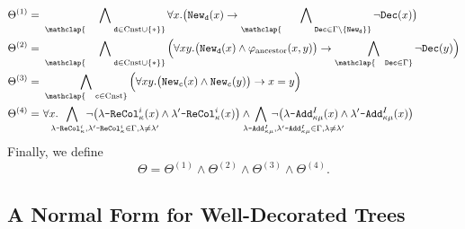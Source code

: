\documentclass[10pt,a4paper]{amsart}
\theoremstyle{definition}
\numberwithin{equation}{section}
\theoremstyle{plain}
\theoremstyle{definition}
\theoremstyle{myexample}
\theoremstyle{plain}
\theoremstyle{definition}
\newcommand{\disun}{\oplus}
\newcommand{\newconst}[1]{\pred{New}_{\const{#1}}} %
\newcommand{\cadd}[4]{#4\pred{\texttt{-}Add}^{#3}_{#1#2}} %
\newcommand{\recol}[2]{#2\pred{\texttt{-}ReCol}_{#1}}
\newcommand{\pred}[1]{\mathtt{#1}}
\newcommand{\const}[1]{\mathtt{#1}}
\begin{document}
\begin{align*}
\Theta^{\mathrm{(1)}} =\ &  \bigwedge_{\mathclap{\hspace{6ex}\const{d}\in\mathrm{Cnst}\cup\{ \ast \}}} \forall x.\big( \newconst{d}(x)\rightarrow \bigwedge_{\mathclap{\hspace{7ex}\pred{Dec}\in\Gamma{\setminus}\{ \newconst{d} \}}} \lnot\pred{Dec}(x) \big)\\
%
\Theta^{\mathrm{(2)}} =\ & \bigwedge_{\mathclap{\hspace{6ex}\const{d}\in\mathrm{Cnst}\cup\{ \ast \}}} \Big(\forall xy. \big(\newconst{d}(x) \wedge \varphi_{\mathrm{ancestor}}(x,y) \big) \rightarrow \bigwedge_{\mathclap{\hspace{2ex}\pred{Dec}\in\Gamma}}\lnot\pred{Dec}(y)\Big)\\
%
\Theta^{\mathrm{(3)}} =\ & \bigwedge_{\mathclap{\hspace{2ex}\const{c}\in\mathrm{Cnst}}} \Big( \forall xy. \big(\newconst{c}(x) \land \newconst{c}(y)\big) \rightarrow x = y \Big)\\
%
\Theta^{\mathrm{(4)}} =\ & \forall x. \hspace{-16ex}\bigwedge_{\hspace{14ex}{\recol{\kappa}{\lambda}^{i},\recol{\kappa}{\lambda'}^{i}\in\Gamma, \lambda\neq\lambda'}}\hspace{-16ex}\lnot\big(\recol{\kappa}{\lambda}^{i}(x)\land \recol{\kappa}{\lambda'}^{i}(x)\big) \land \hspace{-16ex}\bigwedge_{\hspace{14ex}{\cadd{\kappa}{\mu}{I}{\lambda}, \cadd{\kappa}{\mu}{I}{\lambda'}\in\Gamma, \lambda\neq \lambda'}}\hspace{-16ex}\lnot\big(\cadd{\kappa}{\mu}{I}{\lambda}(x) \land \cadd{\kappa}{\mu}{I}{\lambda'}(x)\big)
\end{align*}
Finally, we define 
$$ \Theta = \Theta^{\mathrm{(1)}} \land \Theta^{\mathrm{(2)}} \land \Theta^{\mathrm{(3)}} \land \Theta^{\mathrm{(4)}}.$$

\subsection{A Normal Form for Well-Decorated Trees}
\renewcommand{\disun}{\uplus}
\end{document}

